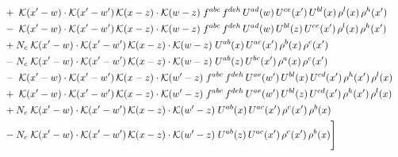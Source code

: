 \documentclass[9pt]{article}
\begin{document}
\begin{align}
&\quad +\;\mathcal{K}(x'-w)\cdot\mathcal{K}(x'-w')\,\mathcal{K}(x-z)\cdot\mathcal{K}(w-z)\;f^{abc}\,f^{deh}\,U^{ad}(w)\,U^{ce}(x')\,U^{bl}(x)\,\rho^{l}(x)\,\rho^{h}(x')\notag\\
&\quad -\;\mathcal{K}(x'-w)\cdot\mathcal{K}(x'-w')\,\mathcal{K}(x-z)\cdot\mathcal{K}(w-z)\;f^{abc}\,f^{deh}\,U^{ad}(w)\,U^{bl}(z)\,U^{ce}(x')\,\rho^{l}(x)\,\rho^{h}(x')\notag\\
&\quad +N_c\;\mathcal{K}(x'-w)\cdot\mathcal{K}(x'-w')\,\mathcal{K}(x-z)\cdot\mathcal{K}(w-z)\;U^{ab}(x)\,U^{ac}(x')\,\rho^{b}(x)\,\rho^{c}(x')\notag\\
&\quad -N_c\;\mathcal{K}(x'-w)\cdot\mathcal{K}(x'-w')\,\mathcal{K}(x-z)\cdot\mathcal{K}(w-z)\;U^{ab}(z)\,U^{bc}(x')\,\rho^{a}(x)\,\rho^{c}(x')\notag\\
&\quad -\;\mathcal{K}(x'-w)\cdot\mathcal{K}(x'-w')\,\mathcal{K}(x-z)\cdot\mathcal{K}(w'-z)\;f^{abc}\,f^{deh}\,U^{ae}(w')\,U^{bl}(x)\,U^{cd}(x')\,\rho^{h}(x')\,\rho^{l}(x)\notag\\
&\quad +\;\mathcal{K}(x'-w)\cdot\mathcal{K}(x'-w')\,\mathcal{K}(x-z)\cdot\mathcal{K}(w'-z)\;f^{abc}\,f^{deh}\,U^{ae}(w')\,U^{bl}(z)\,U^{cd}(x')\,\rho^{h}(x')\,\rho^{l}(x)\notag\\
&\quad +N_c\;\mathcal{K}(x'-w)\cdot\mathcal{K}(x'-w')\,\mathcal{K}(x-z)\cdot\mathcal{K}(w'-z)\;U^{ab}(x)\,U^{ac}(x')\,\rho^{c}(x')\,\rho^{b}(x)\notag\\
&\quad -N_c\;\mathcal{K}(x'-w)\cdot\mathcal{K}(x'-w')\,\mathcal{K}(x-z)\cdot\mathcal{K}(w'-z)\;U^{ab}(z)\,U^{ac}(x')\,\rho^{c}(x')\,\rho^{b}(x)\Bigg]\label{eq:two}
\end{align}
\end{document}
